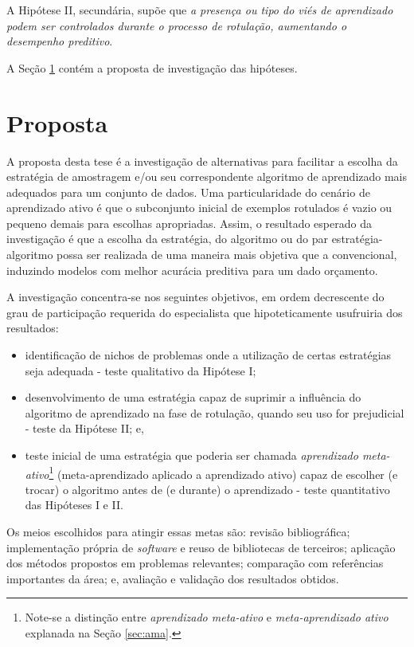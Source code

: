 A Hipótese II, secundária, supõe que \textit{a presença ou tipo do viés de aprendizado podem ser controlados durante o processo de rotulação, aumentando o desempenho preditivo}.

A Seção \ref{intropropostas} contém a proposta de investigação das hipóteses.

\section{Proposta}\label{intropropostas}
A proposta desta tese é a investigação de alternativas para facilitar a escolha da estratégia de amostragem e/ou seu correspondente algoritmo de aprendizado mais adequados para um conjunto de dados.
Uma particularidade do cenário de aprendizado ativo é que o subconjunto inicial de exemplos rotulados é vazio ou pequeno demais para escolhas apropriadas.
Assim, o resultado esperado da investigação é que a escolha da estratégia, do algoritmo ou do par estratégia-algoritmo possa ser realizada de uma maneira mais objetiva que a convencional, induzindo modelos com melhor acurácia preditiva para um dado orçamento.

A investigação concentra-se nos seguintes objetivos, em ordem decrescente do grau de participação requerida do especialista que hipoteticamente usufruiria dos resultados:
\begin{itemize}
   \item identificação de nichos de problemas onde a utilização de certas estratégias seja adequada - teste qualitativo da Hipótese I;
   \item desenvolvimento de uma estratégia capaz de suprimir a influência do algoritmo de aprendizado na fase de rotulação, quando seu uso for prejudicial - teste da Hipótese II; e,
   \item teste inicial de uma estratégia que poderia ser chamada \textit{aprendizado meta-ativo}\footnote{Note-se a distinção entre \textit{aprendizado meta-ativo} e \textit{meta-aprendizado ativo} \cite{conf/ijcnn/SousaPSL13} explanada na Seção \ref{sec:ama}.} (meta-aprendizado aplicado a aprendizado ativo) capaz de escolher (e trocar) o algoritmo antes de (e durante) o aprendizado - teste quantitativo das Hipóteses I e II. 
\end{itemize}
Os meios escolhidos para atingir essas metas são: revisão bibliográfica; implementação própria de \textit{software} e reuso de bibliotecas de terceiros; aplicação dos métodos propostos em problemas relevantes; comparação com referências importantes da área; e, avaliação e validação dos resultados obtidos.

